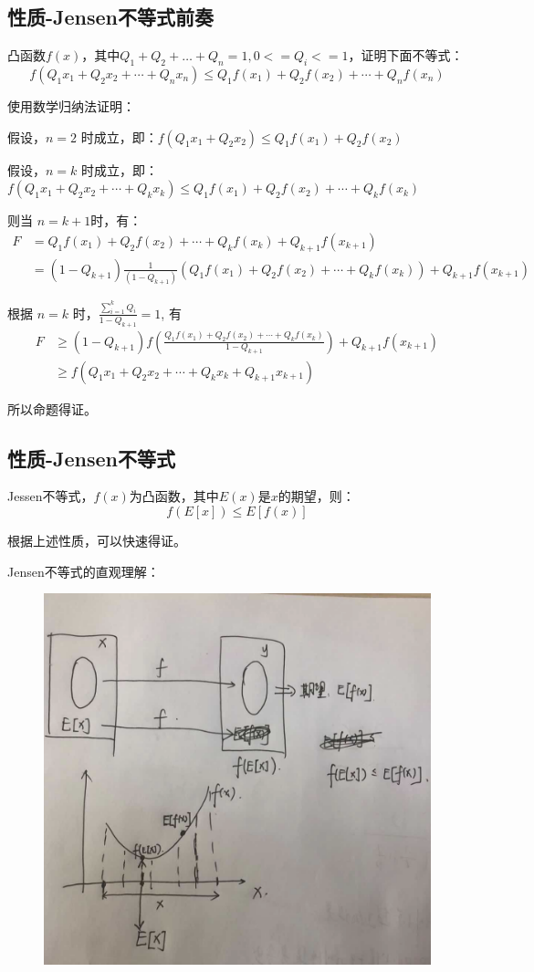 \documentclass[12pt]{article}
\begin{document}
\subsection{性质-Jensen不等式前奏}
凸函数$f(x)$，其中$Q_1+Q_2+…+Q_n=1,0<= Q_i<=1$，证明下面不等式：
$$
f(Q_1x_1 + Q_2x_2 + \cdots + Q_nx_n) \le Q_1f(x_1) + Q_2f(x_2) + \cdots + Q_nf(x_n)
$$

\begin{framed}  
\small{
使用数学归纳法证明：

假设，$n=2$ 时成立，即：$f(Q_1x_1 + Q_2x_2) \le Q_1f(x_1) + Q_2f(x_2)$

假设，$n=k$ 时成立，即：$f(Q_1x_1 + Q_2x_2 + \cdots + Q_kx_k) \le Q_1f(x_1) + Q_2f(x_2) + \cdots + Q_kf(x_k)$


则当 $n=k+1$时，有：
\begin{align*}
F &= Q_1f(x_1) + Q_2f(x_2) + \cdots + Q_kf(x_k) +  Q_{k+1}f(x_{k+1}) \\
  &= (1-Q_{k+1})\frac{1}{(1-Q_{k+1})}(Q_1f(x_1) + Q_2f(x_2) + \cdots + Q_kf(x_k)) + Q_{k+1}f(x_{k+1})
\end{align*}

根据 $n=k$ 时，$\frac{\sum_{i=1}^kQ_i}{1-Q_{k+1}} = 1$, 有
\begin{align*}
    F &\ge (1-Q_{k+1})f(\frac{Q_1f(x_1) + Q_2f(x_2) + \cdots + Q_kf(x_k)}{1-Q_{k+1}}) + Q_{k+1}f(x_{k+1}) \\
  &\ge f(Q_1x_1 + Q_2x_2 + \cdots + Q_kx_k + Q_{k+1}x_{k+1})
\end{align*}

所以命题得证。
}
\end{framed}

\subsection{性质-Jensen不等式}
Jessen不等式，$f(x)$为凸函数，其中$E(x)$是$x$的期望，则：
$$
f(E[x]) \le E[f(x)]
$$

\begin{framed}  
\small{
根据上述性质，可以快速得证。
}
\end{framed}

Jensen不等式的直观理解：
\begin{figure}[H]
    \centering
    \includegraphics[width=.6\textwidth]{fig/Jensen_Unequal_Example.png}
\end{figure}
\end{document}
